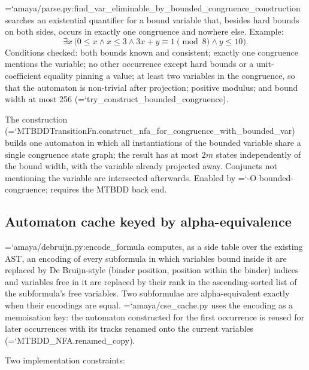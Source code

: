 \documentclass[10pt,a4paper]{article}
\newcommand{\code}[1]{{\small\ttfamily\hyphenchar\font=`\-\relax #1}}
\begin{document}
\code{amaya/parse.py:\allowbreak find\_\allowbreak var\_\allowbreak eliminable\_\allowbreak by\_\allowbreak bounded\_\allowbreak congruence\_\allowbreak construction} searches an
existential quantifier for a bound variable that, besides hard bounds on both sides, occurs in exactly
one congruence and nowhere else.  Example:
\[
  \exists x\,\big( 0 \leq x \wedge x \leq 3 \wedge 3x + y \equiv 1 \!\!\pmod 8 \wedge y \leq 10 \big).
\]
Conditions checked: both bounds known and consistent; exactly one congruence mentions the variable; no
other occurrence except hard bounds or a unit-coefficient equality pinning a value; at least two
variables in the congruence, so that the automaton is non-trivial after projection; positive modulus;
and bound width at most 256 (\code{try\_\allowbreak construct\_\allowbreak bounded\_\allowbreak congruence}).

The construction (\code{MTBDDTransitionFn.\allowbreak construct\_\allowbreak nfa\_\allowbreak for\_\allowbreak congruence\_\allowbreak with\_\allowbreak bounded\_\allowbreak var}) builds
one automaton in which all instantiations of the bounded variable share a single congruence state
graph; the result has at most $2m$ states independently of the bound width, with the variable already
projected away.  Conjuncts not mentioning the variable are intersected afterwards.  Enabled by
\code{-O bounded-congruence}; requires the MTBDD back end.

\subsection{Automaton cache keyed by alpha-equivalence}
\label{sec:cse}

\code{amaya/debruijn.py:\allowbreak encode\_\allowbreak formula} computes, as a side table over the existing AST, an encoding
of every subformula in which variables bound inside it are replaced by De Bruijn-style (binder
position, position within the binder) indices and variables free in it are replaced by their rank in
the ascending-sorted list of the subformula's free variables.  Two subformulae are alpha-equivalent
exactly when their encodings are equal.  \code{amaya/cse\_cache.py} uses the encoding as a memoisation
key: the automaton constructed for the first occurrence is reused for later occurrences with its tracks
renamed onto the current variables (\code{MTBDD\_NFA.renamed\_copy}).

Two implementation constraints:
\end{document}
